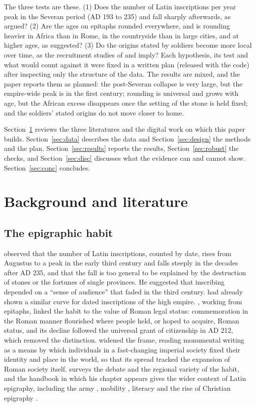 \documentclass[11pt,a4paper]{article}
\begin{document}
The three tests are these. (1) Does the number of Latin inscriptions per year peak in the Severan period (AD 193 to 235) and fall sharply afterwards, as \citet{macmullen1982} argued? (2) Are the ages on epitaphs rounded everywhere, and is rounding heavier in Africa than in Rome, in the countryside than in large cities, and at higher ages, as \citet{duncanjones1977} suggested? (3) Do the origins stated by soldiers become more local over time, as the recruitment studies of \citet{forni1953} and \citet{mann1983} imply? Each hypothesis, its test and what would count against it were fixed in a written plan (released with the code) after inspecting only the structure of the data. The results are mixed, and the paper reports them as planned: the post-Severan collapse is very large, but the empire-wide peak is in the first century; rounding is universal and grows with age, but the African excess disappears once the setting of the stone is held fixed; and the soldiers' stated origins do not move closer to home.

Section~\ref{sec:lit} reviews the three literatures and the digital work on which this paper builds. Section~\ref{sec:data} describes the data and Section~\ref{sec:design} the methods and the plan. Section~\ref{sec:results} reports the results, Section~\ref{sec:robust} the checks, and Section~\ref{sec:disc} discusses what the evidence can and cannot show. Section~\ref{sec:conc} concludes.

\section{Background and literature}\label{sec:lit}
\subsection{The epigraphic habit}
\citet{macmullen1982} observed that the number of Latin inscriptions, counted by date, rises from Augustus to a peak in the early third century and falls steeply in the decades after AD 235, and that the fall is too general to be explained by the destruction of stones or the fortunes of single provinces. He suggested that inscribing depended on a ``sense of audience'' that faded in the third century. \citet{mrozek1973} had already shown a similar curve for dated inscriptions of the high empire. \citet{meyer1990}, working from epitaphs, linked the habit to the value of Roman legal status: commemoration in the Roman manner flourished where people held, or hoped to acquire, Roman status, and its decline followed the universal grant of citizenship in AD 212, which removed the distinction. \citet{woolf1996} widened the frame, reading monumental writing as a means by which individuals in a fast-changing imperial society fixed their identity and place in the world, so that its spread tracked the expansion of Roman society itself. \citet{beltran2014} surveys the debate and the regional variety of the habit, and the handbook in which his chapter appears \citep{bruun2014} gives the wider context of Latin epigraphy, including the army \citep{speidel2014}, mobility \citep{kolb2014}, literacy \citep{bodel2014} and the rise of Christian epigraphy \citep{mazzoleni2014}.
\end{document}
